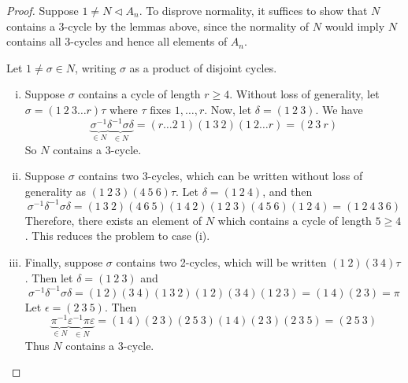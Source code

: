 \begin{proof}
	Suppose \( 1 \neq N \triangleleft A_n \).
	To disprove normality, it suffices to show that \( N \) contains a 3-cycle by the lemmas above, since the normality of \( N \) would imply \( N \) contains all 3-cycles and hence all elements of \( A_n \).

	Let \( 1 \neq \sigma \in N \), writing \( \sigma \) as a product of disjoint cycles.
	\begin{enumerate}[(i)]
		\item Suppose \( \sigma \) contains a cycle of length \( r \geq 4 \).
			Without loss of generality, let \( \sigma = (1\ 2\ 3\dots r) \tau \) where \( \tau \) fixes \( 1, \dots, r \).
			Now, let \( \delta = (1\ 2\ 3) \).
			We have
			\[ \underbrace{\sigma^{-1}}_{\in N} \underbrace{\delta^{-1} \sigma \delta}_{\in N} = (r \dots 2\ 1)(1\ 3\ 2)(1\ 2\dots r) = (2\ 3\ r) \]
			So \( N \) contains a 3-cycle.
		\item Suppose \( \sigma \) contains two 3-cycles, which can be written without loss of generality as \( (1\ 2\ 3)(4\ 5\ 6) \tau \).
			Let \( \delta = (1\ 2\ 4) \), and then
			\[ \sigma^{-1} \delta^{-1} \sigma \delta = (1\ 3\ 2)(4\ 6\ 5)(1\ 4\ 2)(1\ 2\ 3)(4\ 5\ 6)(1\ 2\ 4) = (1\ 2\ 4\ 3\ 6) \]
			Therefore, there exists an element of \( N \) which contains a cycle of length \( 5 \geq 4 \).
			This reduces the problem to case (i).
		\item Finally, suppose \( \sigma \) contains two 2-cycles, which will be written \( (1\ 2)(3\ 4)\tau \).
			Then let \( \delta = (1\ 2\ 3) \) and
			\[ \sigma^{-1} \delta^{-1} \sigma \delta = (1\ 2)(3\ 4)(1\ 3\ 2)(1\ 2)(3\ 4)(1\ 2\ 3) = (1\ 4)(2\ 3) = \pi \]
			Let \( \epsilon = (2\ 3\ 5) \).
			Then
			\[ \underbrace{\pi^{-1}}_{\in N} \underbrace{\varepsilon^{-1} \pi \varepsilon}_{\in N} = (1\ 4)(2\ 3)(2\ 5\ 3)(1\ 4)(2\ 3)(2\ 3\ 5) = (2\ 5\ 3) \]
			Thus \( N \) contains a 3-cycle.
	\end{enumerate}
\end{proof}
